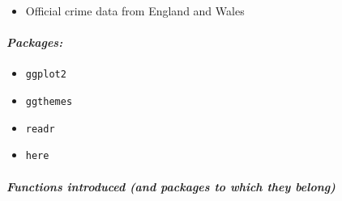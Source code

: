 \documentclass[
]{book}
\providecommand{\tightlist}{%
  \setlength{\itemsep}{0pt}\setlength{\parskip}{0pt}}
\begin{document}
\begin{itemize}
\tightlist
\item
  Official crime data from England and Wales
\end{itemize}

\hypertarget{packages-3}{%
\paragraph*{\texorpdfstring{\emph{Packages:}}{Packages:}}\label{packages-3}}

\begin{itemize}
\tightlist
\item
  \texttt{ggplot2}
\item
  \texttt{ggthemes}
\item
  \texttt{readr}
\item
  \texttt{here}
\end{itemize}

\hypertarget{functions-introduced-and-packages-to-which-they-belong-2}{%
\paragraph*{\texorpdfstring{\emph{Functions introduced (and packages to which they belong)}}{Functions introduced (and packages to which they belong)}}\label{functions-introduced-and-packages-to-which-they-belong-2}}
\end{document}
